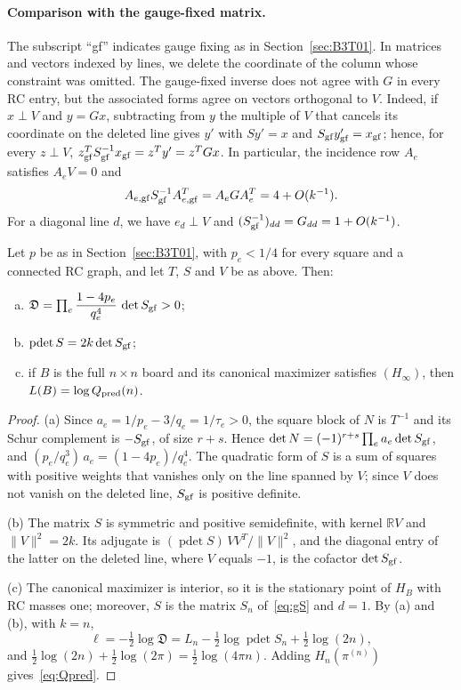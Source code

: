 \paragraph{Comparison with the gauge-fixed matrix.}
The subscript “gf” indicates gauge fixing as in Section~\ref{sec:B3T01}. In matrices and vectors indexed by
lines, we delete the coordinate of the column whose constraint was omitted. The gauge-fixed inverse does not
agree with $G$ in every RC entry, but the associated forms agree on vectors orthogonal to $V$.
Indeed, if $x\perp V$ and $y=Gx$, subtracting from $y$ the multiple of $V$ that cancels its coordinate
on the deleted line gives $y'$ with $Sy'=x$ and $S_{\rm gf}y'_{\rm gf}=x_{\rm gf}$; hence, for every
$z\perp V$, $z_{\rm gf}^TS_{\rm gf}^{-1}x_{\rm gf}=z^Ty'=z^TGx$.
In particular, the incidence row $A_e$ satisfies $A_eV=0$ and
\[
 A_{e,\rm gf}S_{\rm gf}^{-1}A_{e,\rm gf}^T=A_eGA_e^T=4+O(k^{-1}).
\]
For a diagonal line $d$, we have $e_d\perp V$ and $(S_{\rm gf}^{-1})_{dd}=G_{dd}=1+O(k^{-1})$.

\begin{lema}\label{lem:puente}
Let $p$ be as in Section~\ref{sec:B3T01}, with $p_e<1/4$ for every square and a connected RC graph, and
let $T$, $S$ and $V$ be as above. Then:
\begin{enumerate}[(a)]
\item $\mathfrak D=\prod_e\dfrac{1-4p_e}{q_e^4}\,\det S_{\rm gf}>0$;
\item $\operatorname{pdet}S=2k\det S_{\rm gf}$;
\item if $B$ is the full $n\times n$ board and its canonical maximizer satisfies $(H_\infty)$,
 then $L(B)=\log Q_{\rm pred}(n)$.
\end{enumerate}
\end{lema}
\begin{proof}
(a) Since $a_e=1/p_e-3/q_e=1/\tau_e>0$, the square block of $N$ is $T^{-1}$ and its Schur complement
is $-S_{\rm gf}$, of size $r+s$. Hence $\det N=(-1)^{r+s}\prod_ea_e\det S_{\rm gf}$, and
$(p_e/q_e^3)\,a_e=(1-4p_e)/q_e^4$. The quadratic form of $S$ is a sum of squares with positive
weights that vanishes only on the line spanned by $V$; since $V$ does not vanish on the deleted line,
$S_{\rm gf}$ is positive definite.

(b) The matrix $S$ is symmetric and positive semidefinite, with kernel $\mathbb RV$ and $\|V\|^2=2k$.
Its adjugate is $(\operatorname{pdet}S)\,VV^T/\|V\|^2$, and the diagonal entry of the latter on the
deleted line, where $V$ equals $-1$, is the cofactor $\det S_{\rm gf}$.

(c) The canonical maximizer is interior, so it is the stationary point of $H_B$ with RC masses one;
moreover, $S$ is the matrix $S_n$ of~\eqref{eq:gS} and $d=1$. By (a) and (b), with $k=n$,
\[
 \ell=-\tfrac12\log\mathfrak D=L_n-\tfrac12\log\operatorname{pdet}S_n+\tfrac12\log(2n),
\]
and $\tfrac12\log(2n)+\tfrac12\log(2\pi)=\tfrac12\log(4\pi n)$. Adding $H_n(\pi^{(n)})$
gives~\eqref{eq:Qpred}.
\end{proof}
